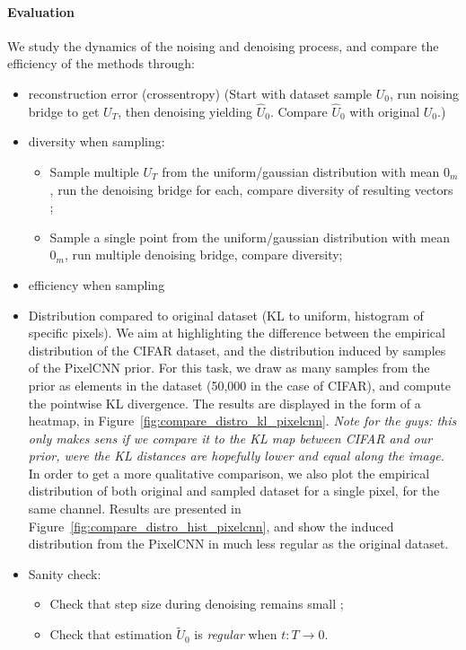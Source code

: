 \documentclass{article}
\begin{document}
\paragraph{Evaluation} We study the dynamics of the noising and denoising process, and compare the efficiency of the methods through:
\begin{itemize}
	\item reconstruction error (crossentropy) (Start with dataset sample $U_0$, run noising bridge to get $U_T$, then denoising yielding $\hat U_0$. Compare $\hat U_0$ with original $U_0$.)
	\item diversity when sampling:
		\begin{itemize}
			\item Sample multiple $U_T$ from the uniform/gaussian distribution with mean $0_m$, run the denoising bridge for each, compare diversity of resulting vectors ;
			\item Sample a single point from the uniform/gaussian distribution with mean $0_m$, run multiple denoising bridge, compare diversity;
		\end{itemize}
	\item efficiency when sampling
	\item Distribution compared to original dataset (KL to uniform, histogram of specific pixels).
We aim at highlighting the difference between the empirical distribution of the CIFAR dataset, and the distribution induced by samples of the PixelCNN prior.
For this task, we draw as many samples from the prior as elements in the dataset (50,000 in the case of CIFAR), and compute the pointwise KL divergence.
The results are displayed in the form of a heatmap, in Figure~\ref{fig:compare_distro_kl_pixelcnn}.
\textit{Note for the guys: this only makes sens if we compare it to the KL map between CIFAR and our prior, were the KL distances are hopefully lower and equal along the image.}
In order to get a more qualitative comparison, we also plot the empirical distribution of both original and sampled dataset for a single pixel, for the same channel.
Results are presented in Figure~\ref{fig:compare_distro_hist_pixelcnn}, and show the induced distribution from the PixelCNN in much less regular as the original dataset.
	\item Sanity check:
		\begin{itemize}
			\item Check that step size during denoising remains small ;
			\item Check that estimation $\tilde U_0$ is \textit{regular} when $t : T \rightarrow 0$.
		\end{itemize}
\end{itemize}
\end{document}
